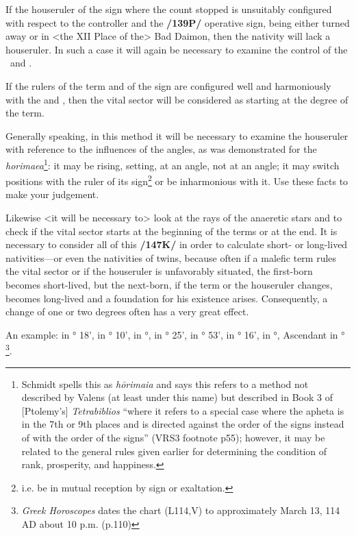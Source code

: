 If the houseruler of the sign where the count stopped is unsuitably configured with respect to the controller and the \textbf{/139P/} operative sign, being either turned away or in <the XII Place of the> Bad Daimon, then the nativity will lack a houseruler. In such a case it will again be necessary to examine the control of the \Sun\, and \Moon. 

If the rulers of the term and of the sign are configured well and harmoniously with the \Sun\xspace and \Moon, then the vital sector will be considered as starting at the degree of the term.

Generally speaking, in this method it will be necessary to examine the houseruler with reference to the influences of the angles, as was demonstrated for the \textsl{horimaea}\footnote{Schmidt spells this as \textsl{h\=orimaia} and says this refers to a method not described by Valens (at least under this name) but described in Book 3 of [Ptolemy's] \textsl{Tetrabiblios} ``where it refers to a special case where the apheta is in the 7th or 9th places and is directed against the order of the signs instead of with the order of the signs'' (VRS3 footnote p55); however, it may be related to the general rules given earlier for determining the condition of rank, prosperity, and happiness.}: it may be rising, setting, at an angle, not at an angle; it may switch positions with the ruler of its sign\footnote{i.e. be in mutual reception by sign or exaltation.} or be inharmonious with it. Use these facts to make your judgement. 

Likewise <it will be necessary to> look at the rays of the anaeretic stars and to check if the vital sector starts at the beginning of the terms or at the end. It is necessary to consider all of this \textbf{/147K/} in order to calculate short- or long-lived nativities—or even the nativities of twins, because often if a malefic term rules the vital sector or if the houseruler is unfavorably situated, the first-born
becomes short-lived, but the next-born, if the term or the houseruler changes, becomes long-lived and a foundation for his existence arises. Consequently, a change of one or two degrees often has a very great effect.

An example: \Sun\xspace in \Taurus\xspace 25° 18', \Moon\xspace in \Aquarius\xspace 7° 10', \Saturn\xspace in \Aries\xspace 24°, \Jupiter\xspace in \Taurus\xspace 4° 25', \Mars\xspace in \Cancer\xspace 22° 53', \Venus\xspace in \Gemini\xspace 28° 16', \Mercury\xspace in \Gemini\xspace 6°, Ascendant in \Capricorn\xspace 27°
\footnote{\textit{Greek Horoscopes} dates the chart (L114,V) to approximately March 13, 114 AD about 10 p.m. (p.110)}. 

